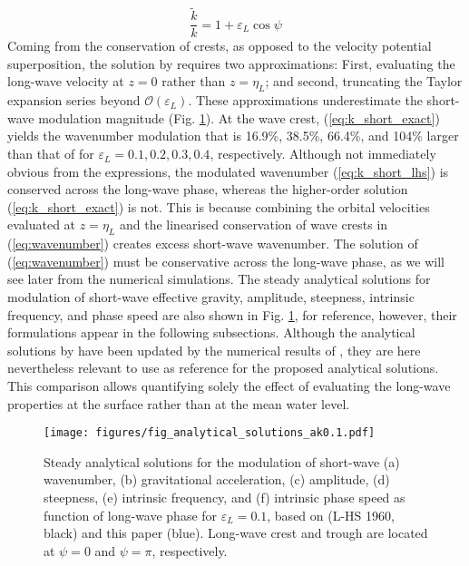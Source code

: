 \documentclass[lineno]{jfm}
\begin{document}
\begin{equation}
\label{eq:k_short_lhs}
\frac{\widetilde{k}}{k} = 1 + \varepsilon_L \cos{\psi}
\end{equation}
Coming from the conservation of crests, as opposed to the velocity potential
superposition, the solution by \citet{longuet1960changes} requires two
approximations:
First, evaluating the long-wave velocity at $z = 0$ rather than $z = \eta_L$; and
second, truncating the Taylor expansion series beyond $\mathcal{O}(\varepsilon_L)$.
These approximations underestimate the short-wave modulation magnitude
(Fig. \ref{fig:analytical_solutions_ak0.1}).
At the wave crest, (\ref{eq:k_short_exact}) yields the wavenumber modulation
that is 16.9\%, 38.5\%, 66.4\%, and 104\% larger than that of
\citet{longuet1960changes} for $\varepsilon_L = 0.1, 0.2, 0.3, 0.4$, respectively.
Although not immediately obvious from the expressions, the modulated wavenumber
(\ref{eq:k_short_lhs}) is conserved across the long-wave phase, whereas
the higher-order solution (\ref{eq:k_short_exact}) is not.
This is because combining the orbital velocities evaluated at $z=\eta_L$ and the
linearised conservation of wave crests in (\ref{eq:wavenumber}) creates excess
short-wave wavenumber.
The solution of (\ref{eq:wavenumber}) must be conservative across the long-wave
phase, as we will see later from the numerical simulations.
The steady analytical solutions for modulation of short-wave effective gravity,
amplitude, steepness, intrinsic frequency, and phase speed are also shown in
Fig. \ref{fig:analytical_solutions_ak0.1}, for reference, however, their
formulations appear in the following subsections.
Although the analytical solutions by \citet{longuet1960changes} have been updated
by the numerical results of \citet{longuet1987propagation}, they are here
nevertheless relevant to use as reference for the proposed analytical solutions.
This comparison allows quantifying solely the effect of evaluating the
long-wave properties at the surface rather than at the mean water level.

\begin{figure}
\centering
\texttt{[image: figures/fig\_analytical\_solutions\_ak0.1.pdf]}
\caption{
  Steady analytical solutions for the modulation of short-wave (a) wavenumber, (b)
  gravitational acceleration, (c) amplitude, (d) steepness, (e) intrinsic
  frequency, and (f) intrinsic phase speed as function of long-wave phase for
  $\varepsilon_L = 0.1$, based on
  \citet{longuet1960changes} (L-HS 1960, black) and this paper (blue).
  Long-wave crest and trough are located at $\psi = 0$ and $\psi = \pi$,
  respectively.
}
\label{fig:analytical_solutions_ak0.1}
\end{figure}
\end{document}
